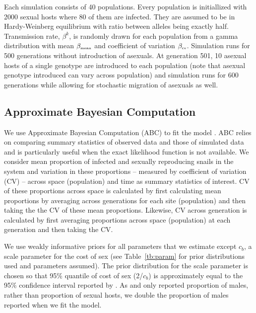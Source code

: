 \documentclass{article}\usepackage[]{graphicx}\usepackage[]{color}
\begin{document}
Each simulation consists of 40 populations. Every population is initiallized with 2000 sexual hosts where 80 of them are infected. They are assumed to be in Hardy-Weinberg equilibrium with ratio between alleles being exactly half. 
Transmission rate, $\beta^k$, is randomly drawn for each population from a gamma distribution with mean $\beta_{\textrm{\tiny mean}}$ and coefficient of variation $\beta_{\textrm{\tiny cv}}$. 
Simulation runs for 500 generations without introduction of asexuals. At generation 501, 10 asexual hosts of a single genotype are introduced to each population (note that asexual genotype introduced can vary across population) and simulation runs for 600 generations while allowing for stochastic migration of asexuals as well.

\subsection{Approximate Bayesian Computation}

We use Approximate Bayesian Computation (ABC) to fit the model \citep{toni2009approximate}.
ABC relies on comparing summary statistics of observed data and those of simulated data and is particularly useful when the exact likelihood function is not available.
We consider mean proportion of infected and sexually reproducing snails in the system and variation in these proportions -- measured by coefficient of variation (CV) -- across space (population) and time as summary statistics of interest.
CV of these proportions across space is calculated by first calculating mean proportions by averaging across generations for each site (population) and then taking the the CV of these mean proportions.
Likewise, CV across generation is calculated by first averaging proportions across space (population) at each generation and then taking the CV.

We use weakly informative priors for all parameters that we estimate except $c_b$, a scale parameter for the cost of sex (see Table~\ref{tb:param} for prior distributions used and parameters assumed).
The prior distribution for the scale parameter is chosen so that 95\% quantile of cost of sex (2/$c_b$) is approximately equal to the 95\% confidence interval reported by \cite{gibson2017two}.
As \cite{dagan2013clonal} and \cite{mckone2016fine} only reported proportion of males, rather than proportion of sexual hosts, we double the proportion of males reported when we fit the model.
\end{document}

